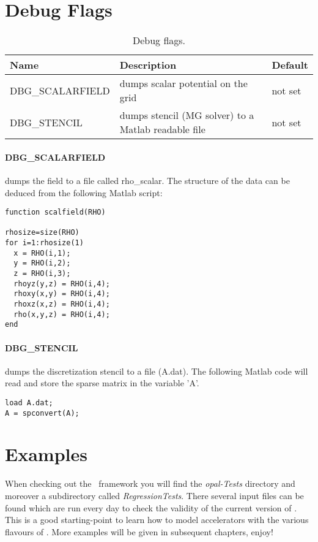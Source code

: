 \section{Debug Flags}\label{sec:debugflags}

\begin{table}[ht]\footnotesize
  \begin{center}
    \caption{Debug flags.}
    \label{tbl:debug_flags}
      \begin{tabular}{lll}
        \hline
        {\bf Name} & {\bf Description} & {\bf Default} \\
        \hline
        DBG\_SCALARFIELD & dumps scalar potential on the grid & not set \\
        DBG\_STENCIL & dumps stencil (MG solver) to a Matlab readable file & not set \\
        \hline
      \end{tabular}
    \end{center}
\end{table}

\paragraph{DBG\_SCALARFIELD} dumps the field to a file called rho\_scalar. The structure of the data can be deduced from the following Matlab script:

\begin{footnotesize}
\begin{verbatim}
function scalfield(RHO)

rhosize=size(RHO)
for i=1:rhosize(1)
  x = RHO(i,1);
  y = RHO(i,2);
  z = RHO(i,3);
  rhoyz(y,z) = RHO(i,4);
  rhoxy(x,y) = RHO(i,4);
  rhoxz(x,z) = RHO(i,4);
  rho(x,y,z) = RHO(i,4);
end
\end{verbatim}
\end{footnotesize}

\paragraph{DBG\_STENCIL} dumps the discretization stencil to a file (A.dat). The following Matlab code will read and store the sparse matrix in the variable 'A'.

\begin{footnotesize}
\begin{verbatim}
load A.dat;
A = spconvert(A);
\end{verbatim}
\end{footnotesize}


\section{Examples}
When checking out the \opal\ framework you will find the {\em opal-Tests} directory and moreover
a subdirectory called {\em RegressionTests}. There several input files can be found which are
run every day to check the validity of the current version of \opal. This is a good starting-point to learn how to
model accelerators with the various flavours of \opal. More examples will be given in subsequent chapters, enjoy!



